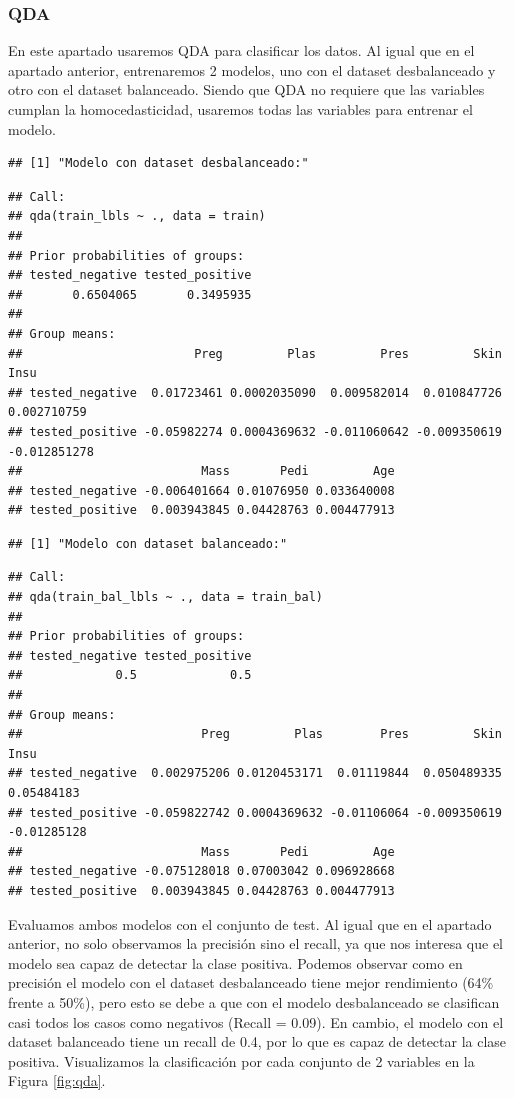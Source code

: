 \documentclass[
]{article}
\begin{document}
\hypertarget{qda}{%
\subsubsection{QDA}\label{qda}}

En este apartado usaremos QDA para clasificar los datos. Al igual que en
el apartado anterior, entrenaremos 2 modelos, uno con el dataset
desbalanceado y otro con el dataset balanceado. Siendo que QDA no
requiere que las variables cumplan la homocedasticidad, usaremos todas
las variables para entrenar el modelo.

\begin{verbatim}
## [1] "Modelo con dataset desbalanceado:"
\end{verbatim}

\begin{verbatim}
## Call:
## qda(train_lbls ~ ., data = train)
## 
## Prior probabilities of groups:
## tested_negative tested_positive 
##       0.6504065       0.3495935 
## 
## Group means:
##                        Preg         Plas         Pres         Skin         Insu
## tested_negative  0.01723461 0.0002035090  0.009582014  0.010847726  0.002710759
## tested_positive -0.05982274 0.0004369632 -0.011060642 -0.009350619 -0.012851278
##                         Mass       Pedi         Age
## tested_negative -0.006401664 0.01076950 0.033640008
## tested_positive  0.003943845 0.04428763 0.004477913
\end{verbatim}

\begin{verbatim}
## [1] "Modelo con dataset balanceado:"
\end{verbatim}

\begin{verbatim}
## Call:
## qda(train_bal_lbls ~ ., data = train_bal)
## 
## Prior probabilities of groups:
## tested_negative tested_positive 
##             0.5             0.5 
## 
## Group means:
##                         Preg         Plas        Pres         Skin        Insu
## tested_negative  0.002975206 0.0120453171  0.01119844  0.050489335  0.05484183
## tested_positive -0.059822742 0.0004369632 -0.01106064 -0.009350619 -0.01285128
##                         Mass       Pedi         Age
## tested_negative -0.075128018 0.07003042 0.096928668
## tested_positive  0.003943845 0.04428763 0.004477913
\end{verbatim}

Evaluamos ambos modelos con el conjunto de test. Al igual que en el
apartado anterior, no solo observamos la precisión sino el recall, ya
que nos interesa que el modelo sea capaz de detectar la clase positiva.
Podemos observar como en precisión el modelo con el dataset
desbalanceado tiene mejor rendimiento (64\% frente a 50\%), pero esto se
debe a que con el modelo desbalanceado se clasifican casi todos los
casos como negativos (Recall = 0.09). En cambio, el modelo con el
dataset balanceado tiene un recall de 0.4, por lo que es capaz de
detectar la clase positiva. Visualizamos la clasificación por cada
conjunto de 2 variables en la Figura \ref{fig:qda}.
\end{document}
